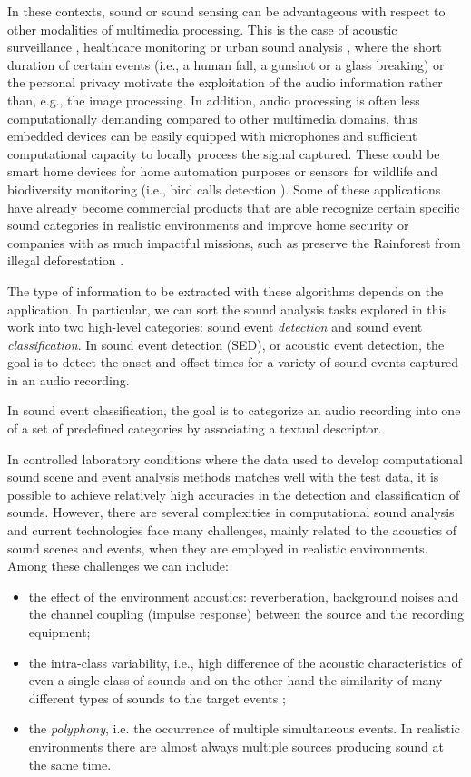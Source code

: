 In these contexts, sound or sound sensing can be advantageous with respect to other modalities of multimedia processing.  
This is the case of acoustic surveillance \cite{crocco2016audio}, healthcare monitoring \cite{peng2009healthcare, foggia2015reliable} or urban sound analysis \cite{salamon2017deep}, where the short duration of certain events (i.e., a human fall, a gunshot or a glass breaking) or the personal privacy motivate the exploitation of the audio information rather than, e.g., the image processing. 
In addition, audio processing is often less computationally demanding compared to other multimedia domains, thus embedded devices can be easily equipped with microphones and sufficient computational capacity to locally process the signal captured. 
These could be smart home devices for home automation purposes or sensors for wildlife and biodiversity monitoring (i.e., bird calls detection \cite{grill2017two}). 
Some of these applications have already become commercial products that are able recognize certain specific sound categories in realistic environments and improve home security \cite{audioanalytic}  or companies with as much impactful missions, such as preserve the Rainforest from illegal deforestation \cite{rainforest}.

The type of information to be extracted with these algorithms depends on the application. In particular, we can sort the sound analysis tasks explored in this work into two high-level categories: sound event \textit{detection} and sound event \textit{classification}.
In sound event detection (SED), or acoustic event detection, the goal is to detect the onset and offset times for a variety of sound events captured in an audio recording. 

In sound event classification, the goal is to categorize an audio recording into one of a set of predefined categories by associating a textual descriptor.

In controlled laboratory conditions where the data used to develop computational sound scene and event analysis methods matches well with the test data, it is possible to achieve relatively high accuracies in the detection and classification of sounds.  However, there are several complexities in computational sound analysis and current technologies face many challenges, mainly related to the acoustics of sound scenes and events, when they are employed in realistic environments.
Among these challenges we can include:
\begin{itemize}
	\item the effect of the environment acoustics: reverberation, background noises and the channel coupling (impulse response) between the source and the recording equipment;
	\item the intra-class variability, i.e., high difference of the acoustic characteristics of even a single class of sounds and on the other hand the similarity of many different types of sounds to the target events  \cite{stowell2015acoustic};
	\item the \textit{polyphony}, i.e. the occurrence of multiple simultaneous events. In realistic environments there
are almost always multiple sources producing sound at the same time. 
\end{itemize}

